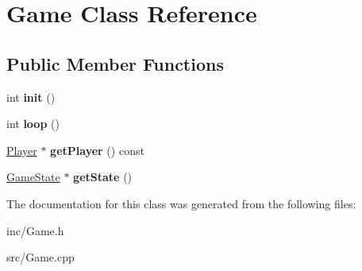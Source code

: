 \hypertarget{class_game}{}\section{Game Class Reference}
\label{class_game}
\subsection*{Public Member Functions}
\begin{DoxyCompactItemize}
\item 
\mbox{\label{class_game_a66bffb23fb564e9bb3067532c6cc8d4e}} 
int {\bfseries init} ()
\item 
\mbox{\label{class_game_acc0d2e0fac7bbb23b720926e416286d1}} 
int {\bfseries loop} ()
\item 
\mbox{\label{class_game_a78627f02c887cca69c96d145701387f7}} 
\hyperlink{class_player}{Player} $\ast$ {\bfseries get\+Player} () const
\item 
\mbox{\label{class_game_a6f686c39cbdf6d2e641fc121dd4fde0d}} 
\hyperlink{class_game_state}{Game\+State} $\ast$ {\bfseries get\+State} ()
\end{DoxyCompactItemize}


The documentation for this class was generated from the following files\+:\begin{DoxyCompactItemize}
\item 
inc/Game.\+h\item 
src/Game.\+cpp\end{DoxyCompactItemize}
